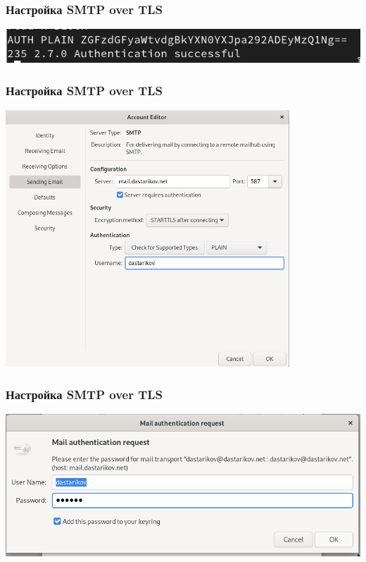 \begin{frame}
  \frametitle{Настройка SMTP over TLS}
    \centering
    \includegraphics[width=\textwidth]{../images/image19.png}
\end{frame}

\begin{frame}
  \frametitle{Настройка SMTP over TLS}
    \centering
    \includegraphics[width=0.8\textwidth]{../images/image20.png}
\end{frame}

\begin{frame}
  \frametitle{Настройка SMTP over TLS}
    \centering
    \includegraphics[width=\textwidth]{../images/image21.png}
\end{frame}

